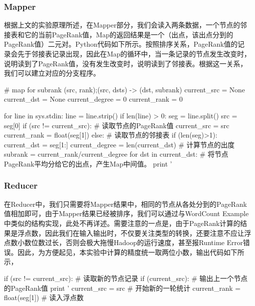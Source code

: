 \documentclass{article}
\begin{document}
\subsubsection{Mapper}
根据上文的实验原理所述，在Mapper部分，我们会读入两条数据，一个节点的邻接表和它的当前PageRank值，Map的返回结果是一个（出点，该出点分到的PageRank值）二元对。Python代码如下所示。按照排序关系，PageRank值的记录会先于邻接表记录出现，因此在Map的循环中，当一条记录的节点发生改变时，说明读到了PageRank值，没有发生改变时，说明读到了邻接表。根据这一关系，我们可以建立对应的分支程序。
\begin{python}
# map for subrank (src, rank);(src, dsts) -> (dst, subrank)
current_src = None
current_dst = None
current_degree = 0
current_rank = 0

for line in sys.stdin:
    line = line.strip()
    if len(line) > 0:
        seg = line.split()
        src = seg[0]
        if (src != current_src):         # 读取节点的PageRank值
            current_src = src
            current_rank = float(seg[1])
        else:                            # 读取节点的邻接表
            if (len(seg)>1):
                current_dst = seg[1:]
                current_degree = len(current_dst)  # 计算节点的出度
                subrank = current_rank/current_degree
                for dst in current_dst:  # 将节点PageRank平均分给它的出点，产生Map中间值。
                    print '%
\end{python}

\subsubsection{Reducer}
在Reducer中，我们只需要将Mapper结果中，相同的节点从各处分到的PageRank值相加即可，由于Mapper结果已经被排序，我们可以通过与WordCount Example中类似的结构实现，此处不再详述。需要注意的一点是，由于PageRank计算的结果是浮点数，因此我们在输入输出时，不仅要关注类型的转换，还要注意不应让浮点数小数位数过长，否则会极大拖慢Hadoop的运行速度，甚至报Runtime Error错误。因此，为方便起见，本实验中计算的精度统一取两位小数，输出代码如下所示，
\begin{python}
if (src != current_src):  # 读取新的节点记录
    if (current_src):     # 输出上一个节点的PageRank值
        print '%
    current_src = src     # 开始新的一轮统计
    current_rank = float(seg[1])  # 读入浮点数
\end{python}
\end{document}

